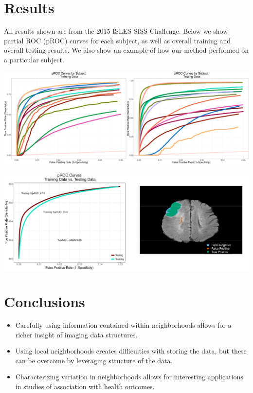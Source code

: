 \documentclass[a0,landscape]{a0poster}
\begin{document}
\begin{multicols}{3}
\large{\section*{\color{uwred}Results}}
\noindent All results shown are from the 2015 ISLES SISS Challenge. Below we show partial ROC (pROC) curves for each subject, as well as overall training and overall testing results. We also show an example of how our method performed on a particular subject.

\begin{center}\vspace{.5cm}
\includegraphics[width=1\linewidth]{procbysubject.pdf}
\end{center}\vspace{.5cm}


\begin{center}\vspace{.5cm}
\includegraphics[width=1\linewidth]{combined.pdf}
\end{center}\vspace{.5cm}

\large{\section*{\color{uwred}Conclusions}}
\begin{itemize}
\item  Carefully using information contained within neighborhoods allows for a richer insight of imaging data structures.
\item Using local neighborhoods creates difficulties with storing the data, but these can be overcome by leveraging structure of the data.
\item Characterizing variation in neighborhoods allows for interesting applications in studies of association with health outcomes. 
\end{itemize}


\end{multicols}
\end{document}
